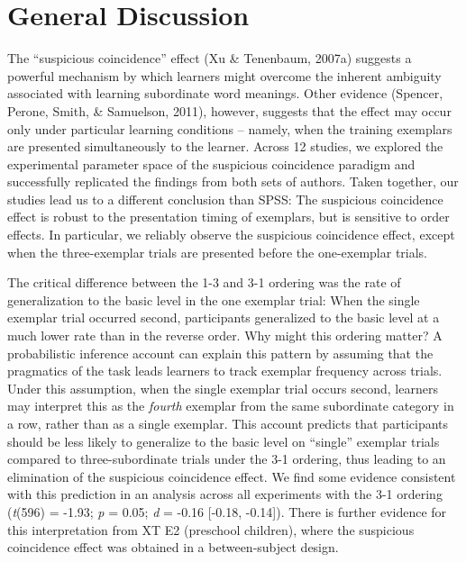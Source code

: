 \documentclass[english,floatsintext,man]{apa6}
\newcounter{author}
\theoremstyle{definition}
\theoremstyle{definition}
\theoremstyle{remark}
\begin{document}
\section{General Discussion}\label{general-discussion}

The ``suspicious coincidence'' effect (Xu \& Tenenbaum, 2007a) suggests
a powerful mechanism by which learners might overcome the inherent
ambiguity associated with learning subordinate word meanings. Other
evidence (Spencer, Perone, Smith, \& Samuelson, 2011), however, suggests
that the effect may occur only under particular learning conditions --
namely, when the training exemplars are presented simultaneously to the
learner. Across 12 studies, we explored the experimental parameter space
of the suspicious coincidence paradigm and successfully replicated the
findings from both sets of authors. Taken together, our studies lead us
to a different conclusion than SPSS: The suspicious coincidence effect
is robust to the presentation timing of exemplars, but is sensitive to
order effects. In particular, we reliably observe the suspicious
coincidence effect, except when the three-exemplar trials are presented
before the one-exemplar trials.

The critical difference between the 1-3 and 3-1 ordering was the rate of
generalization to the basic level in the one exemplar trial: When the
single exemplar trial occurred second, participants generalized to the
basic level at a much lower rate than in the reverse order. Why might
this ordering matter? A probabilistic inference account can explain this
pattern by assuming that the pragmatics of the task leads learners to
track exemplar frequency across trials. Under this assumption, when the
single exemplar trial occurs second, learners may interpret this as the
\emph{fourth} exemplar from the same subordinate category in a row,
rather than as a single exemplar. This account predicts that
participants should be less likely to generalize to the basic level on
\enquote{single} exemplar trials compared to three-subordinate trials
under the 3-1 ordering, thus leading to an elimination of the suspicious
coincidence effect. We find some evidence consistent with this
prediction in an analysis across all experiments with the 3-1 ordering
(\emph{t}(596) = -1.93; \emph{p} = 0.05; \emph{d} = -0.16 {[}-0.18,
-0.14{]}). There is further evidence for this interpretation from XT E2
(preschool children), where the suspicious coincidence effect was
obtained in a between-subject design.
\end{document}
